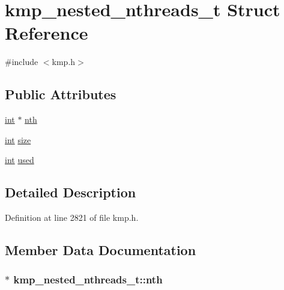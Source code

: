 \hypertarget{structkmp__nested__nthreads__t}{\section{kmp\-\_\-nested\-\_\-nthreads\-\_\-t Struct Reference}
\label{structkmp__nested__nthreads__t}
}


{\ttfamily \#include $<$kmp.\-h$>$}

\subsection*{Public Attributes}
\begin{DoxyCompactItemize}
\item 
\hyperlink{ittnotify__static_8h_a8b8dcd723308a8cb5d84277c7a3fff70}{int} $\ast$ \hyperlink{structkmp__nested__nthreads__t_acea2450edad467092ec428717c924ae3}{nth}
\item 
\hyperlink{ittnotify__static_8h_a8b8dcd723308a8cb5d84277c7a3fff70}{int} \hyperlink{structkmp__nested__nthreads__t_adee4be6710fdc135bda1098d9f61458e}{size}
\item 
\hyperlink{ittnotify__static_8h_a8b8dcd723308a8cb5d84277c7a3fff70}{int} \hyperlink{structkmp__nested__nthreads__t_aa7837e3819e8a02eb1fafcc4ff890939}{used}
\end{DoxyCompactItemize}


\subsection{Detailed Description}


Definition at line 2821 of file kmp.\-h.



\subsection{Member Data Documentation}
\hypertarget{structkmp__nested__nthreads__t_acea2450edad467092ec428717c924ae3}{
\subsubsection[{nth}]{$\ast$ kmp\-\_\-nested\-\_\-nthreads\-\_\-t\-::nth}}\label{structkmp__nested__nthreads__t_acea2450edad467092ec428717c924ae3}


